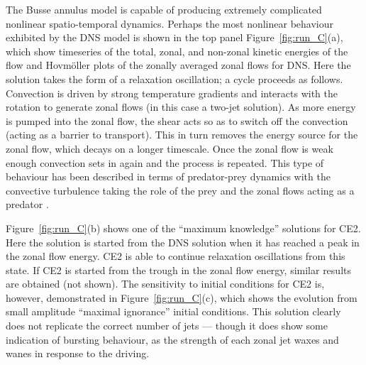 \documentclass{jfm}
\begin{document}
The Busse annulus model is capable of producing extremely complicated nonlinear spatio-temporal dynamics. Perhaps the most nonlinear behaviour exhibited by the DNS model is shown in the top panel Figure~\ref{fig:run_C}(a), which show timeseries of the total, zonal, and non-zonal kinetic energies of the flow and Hovm\"oller plots of the zonally averaged zonal flows for DNS. Here the solution takes the form of a relaxation oscillation; a cycle proceeds as follows. Convection is driven by strong temperature gradients and interacts with the rotation to generate zonal flows (in this case a two-jet solution). As more energy is pumped into the zonal flow, the shear acts so as to switch off the convection (acting as a barrier to transport). This in turn removes the energy source for the zonal flow, which decays on a longer timescale. Once the zonal flow is weak enough convection sets in again and the process is repeated. This type of behaviour has been described in terms of predator-prey dynamics with the convective turbulence taking the role of the prey and the zonal flows acting as a predator \citep[e.g.][]{rj2006, tom_2018}. 

Figure~\ref{fig:run_C}(b) shows one of the ``maximum knowledge'' solutions for CE2. Here the solution is started from the DNS solution when it has reached a peak in the zonal flow energy. CE2 is able to continue relaxation oscillations from this state. If CE2 is started from the trough in the zonal flow energy, similar results are obtained (not shown). The sensitivity to initial conditions for CE2 is, however, demonstrated in Figure~\ref{fig:run_C}(c), which shows the evolution from small amplitude ``maximal ignorance'' initial conditions. This solution clearly does not replicate the correct number of jets --- though it does show some indication of bursting behaviour, as the strength of each zonal jet waxes and wanes in response to the driving.








\end{document}
